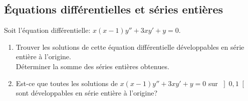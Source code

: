 \documentclass[a4paper,twoside,french,11pt]{VcCours}
\begin{document}
\subsection{Équations différentielles et séries entières}


\begin{Exercice}{} Soit l'équation différentielle: $x(x-1)y''+3xy'+y=0$.
\begin{enumerate}
\item Trouver les solutions de cette équation différentielle développables en série entière à l'origine.\\ Déterminer la somme des séries entières obtenues.

\item 
Est-ce que toutes les solutions de $x(x-1)y''+3xy'+y=0$ sur $\left]0,1 \right[$ sont développables en série entière à l'origine? 
\end{enumerate}
\end{Exercice}
\end{document}
